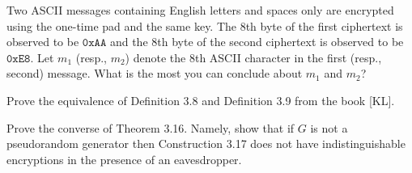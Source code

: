 \documentclass[a4paper,10pt,landscape,twocolumn]{scrartcl}
\begin{document}

\begin{exercise}
Two ASCII messages containing English letters and spaces only are encrypted using the one-time pad and the same key. The 8th byte of the first ciphertext is observed to be $\mathtt{0xAA}$ and the 8th byte of the second ciphertext is observed to be $\mathtt{0xE8}$. Let $m_1$ (resp., $m_2$) denote the 8th ASCII character in the first (resp., second) message. What is the most you can conclude about $m_1$ and $m_2$?
\end{exercise}

\begin{bonusexercise}
Prove the equivalence of Definition 3.8 and Definition 3.9 from the book [KL].
\end{bonusexercise}


\begin{bonusexercise}
Prove the converse of Theorem 3.16. Namely, show that if $G$ is not a pseudorandom generator then Construction 3.17 does not have indistinguishable encryptions in the presence of an eavesdropper.
\end{bonusexercise}
\end{document}
